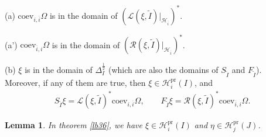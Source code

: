 \documentclass[12pt,a4paper]{article}
\theoremstyle{definition}
\theoremstyle{plain}
\newtheorem{lm}[df]{Lemma}
\newcommand{\mc}{\mathcal}
\newcommand{\wtd}{\widetilde}
\newcommand{\ovl}{\overline}
\newcommand{\coev}{\mathrm{coev}}
\newcommand{\scr}{\mathscr}
\newcommand{\pr}{\mathrm{pr}}
\numberwithin{equation}{subsection}
\begin{document}
(a) $\coev_{i,\ovl i}\Omega$ is in the domain of $(\scr L(\xi,\wtd I)|_{\mc H_{\ovl i}})^*$.

(a') $\coev_{\ovl i,i}\Omega$ is in the domain of $(\scr R(\xi,\wtd I)|_{\mc H_{\ovl i}})^*$.

(b) $\xi$ is in the domain of $\Delta_I^{\frac 12}$ (which are also the domains of $S_{\wtd I}$ and  $F_{\wtd I}$).\\
Moreover, if any of them are true, then   $\xi\in\mc H_i^\pr(I)$, and
\begin{align}
S_{\wtd I}\xi=\scr L(\xi,\wtd I)^*\coev_{i,\ovl i}\Omega,\qquad F_{\wtd I}\xi=\scr R(\xi,\wtd I)^*\coev_{\ovl i,i}\Omega.\label{eq32}
\end{align} 

\begin{lm}\label{lb37}
In theorem \ref{lb36}, we have $\xi\in\mc H_i^\pr(I)$ and $\eta\in\mc H_j^\pr(J)$.
\end{lm}
\end{document}
